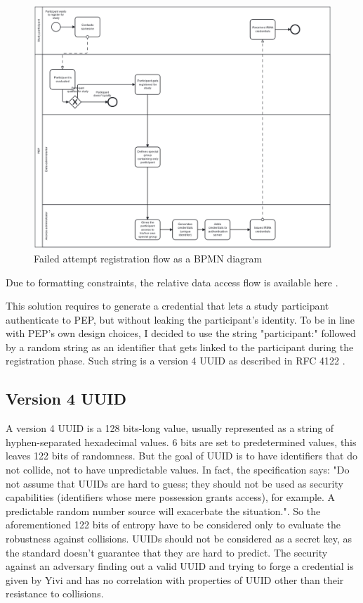 \documentclass{report}
\begin{document}
\begin{figure}[H]
	\includegraphics[scale=0.3]{registration_flow.png}
	\caption{Failed attempt registration flow as a BPMN diagram}
	\label{bpmn-registration-flow}
\end{figure}

Due to formatting constraints, the relative data access flow is available here \cite{data-access-failed-attempt-bpmn-diagram}.

This solution requires to generate a credential that lets a study participant authenticate to PEP, but without leaking the participant's identity. To be in line with PEP's own
design choices, I decided to use the string "participant:" followed by a random string as an identifier that gets linked to the participant during the registration phase. Such string is 
a version 4 UUID as described in RFC 4122 \cite{uuid_rfc}.  

\subsection{Version 4 UUID}
A version 4 UUID is a 128 bits-long value, usually represented as a string of hyphen-separated hexadecimal values. 6 bits are set to predetermined values, this leaves 122 bits of
randomness. But the goal of UUID is to have identifiers that do not collide, not to have unpredictable values. In fact, the specification says: "Do not assume that UUIDs are hard
to guess; they should not be used as security capabilities (identifiers whose mere possession grants access), for example. A predictable random number source will exacerbate the
situation.". So the aforementioned 122 bits of entropy have to be considered only to evaluate the robustness against collisions. UUIDs should not be considered as a secret key, as
the standard doesn't guarantee that they are hard to predict. The security against an adversary finding out a valid UUID and trying to forge a credential is given by Yivi and has
no correlation with properties of UUID other than their resistance to collisions.
\end{document}
